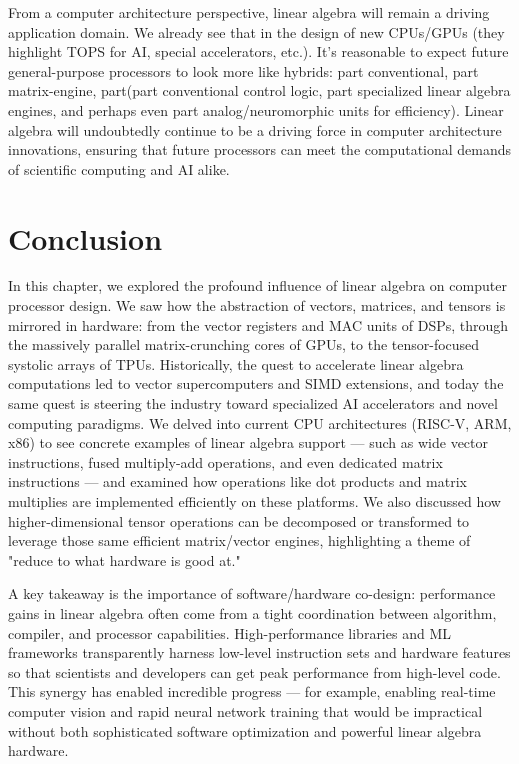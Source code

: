 From a computer architecture perspective, linear algebra will remain a driving application domain. We already see that in the design of new CPUs/GPUs (they highlight TOPS for AI, special accelerators, etc.). It’s reasonable to expect future general-purpose processors to look more like hybrids: part conventional, part matrix-engine, part(part conventional control logic, part specialized linear algebra engines, and perhaps even part analog/neuromorphic units for efficiency). Linear algebra will undoubtedly continue to be a driving force in computer architecture innovations, ensuring that future processors can meet the computational demands of scientific computing and AI alike.

\section{Conclusion}  

In this chapter, we explored the profound influence of linear algebra on computer processor design. We saw how the abstraction of vectors, matrices, and tensors is mirrored in hardware: from the vector registers and MAC units of DSPs, through the massively parallel matrix-crunching cores of GPUs, to the tensor-focused systolic arrays of TPUs. Historically, the quest to accelerate linear algebra computations led to vector supercomputers and SIMD extensions, and today the same quest is steering the industry toward specialized AI accelerators and novel computing paradigms. We delved into current CPU architectures (RISC-V, ARM, x86) to see concrete examples of linear algebra support — such as wide vector instructions, fused multiply-add operations, and even dedicated matrix instructions — and examined how operations like dot products and matrix multiplies are implemented efficiently on these platforms. We also discussed how higher-dimensional tensor operations can be decomposed or transformed to leverage those same efficient matrix/vector engines, highlighting a theme of "reduce to what hardware is good at."

A key takeaway is the importance of software/hardware co-design: performance gains in linear algebra often come from a tight coordination between algorithm, compiler, and processor capabilities. High-performance libraries and ML frameworks transparently harness low-level instruction sets and hardware features so that scientists and developers can get peak performance from high-level code. This synergy has enabled incredible progress — for example, enabling real-time computer vision and rapid neural network training that would be impractical without both sophisticated software optimization and powerful linear algebra hardware.

